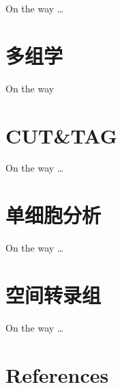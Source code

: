 \documentclass[
]{book}
\begin{document}
On the way \ldots{}

\chapter{多组学}\label{multi-omics}

On the way

\chapter{CUT\&TAG}\label{cuttag}

On the way \ldots{}

\chapter{单细胞分析}\label{scRNA}

On the way \ldots{}

\chapter{空间转录组}\label{spatial}

On the way \ldots{}

\chapter*{References}\label{references}

  
\end{document}
